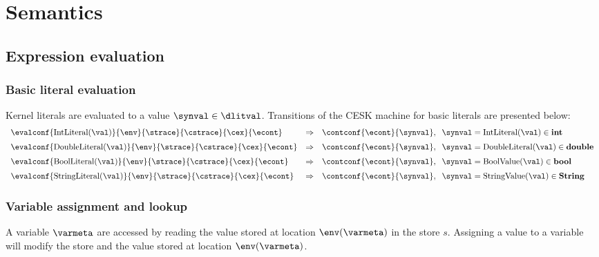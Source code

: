 \documentclass{article}
\begin{document}
\section{Semantics}
\label{sec:semantics}
\subsection{Expression evaluation}
\label{subsec:expr-evaluation}
\subsubsection{Basic literal evaluation}
\label{subsubsec:basic-literal-eval}
Kernel literals are evaluated to a value $\synval \in \dlitval$. Transitions of the CESK machine for basic literals are presented below:
\[
  \begin{array}{lcll}
	\evalconf{\mathrm{IntLiteral(\val)}}{\env}{\strace}{\cstrace}{\cex}{\econt}
	& \Rightarrow &
	\contconf{\econt}{\synval},
	\hspace{2mm}\synval = \mathrm{IntLiteral(\val)} \in \mathbf{int}\\[2mm]

	\evalconf{\mathrm{DoubleLiteral(\val)}}{\env}{\strace}{\cstrace}{\cex}{\econt}
	& \Rightarrow &
	\contconf{\econt}{\synval},
	\hspace{2mm}\synval = \mathrm{DoubleLiteral(\val)} \in \mathbf{double}\\[2mm]

	\evalconf{\mathrm{BoolLiteral(\val)}}{\env}{\strace}{\cstrace}{\cex}{\econt}
	& \Rightarrow &
	\contconf{\econt}{\synval},
	\hspace{2mm}\synval = \mathrm{BoolValue(\val)} \in \mathbf{bool}\\[2mm]

	\evalconf{\mathrm{StringLiteral(\val)}}{\env}{\strace}{\cstrace}{\cex}{\econt}
	& \Rightarrow &
	\contconf{\econt}{\synval},
	\hspace{2mm}\synval = \mathrm{StringValue(\val)} \in \mathbf{String}

  \end{array}
\]

\subsubsection{Variable assignment and lookup}
\label{subsubsec:variable-assignment-and-lookup}
A variable $\varmeta$ are accessed by reading the value stored at location $\env(\varmeta)$ in the store $s$. Assigning a value to a variable will modify the store and the value stored at location  $\env(\varmeta)$.
\end{document}
